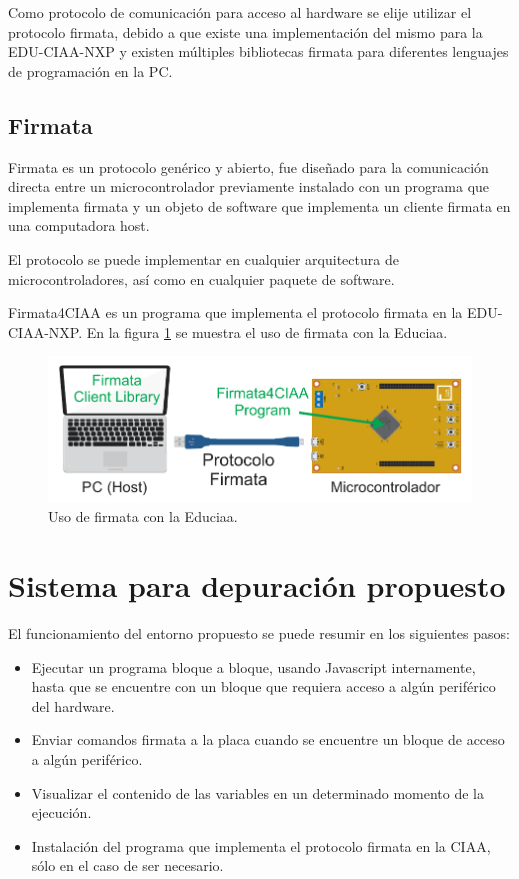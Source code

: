 Como protocolo de comunicación para acceso al hardware se elije utilizar el protocolo firmata, debido a que existe una implementación del mismo para la EDU-CIAA-NXP \citep{CIAA:firmwarev2} y existen múltiples bibliotecas firmata para diferentes lenguajes de programación en la PC.  

\subsection{Firmata}
\label{subsec:Firmata}

Firmata es un protocolo genérico y abierto, fue diseñado para la comunicación directa entre un microcontrolador previamente instalado con un programa que implementa firmata y un objeto de software que implementa un cliente firmata en una computadora host. 

El protocolo se puede implementar en cualquier arquitectura de microcontroladores, así como en cualquier paquete de software.

Firmata4CIAA es un programa que implementa el protocolo firmata en la EDU-CIAA-NXP. En la figura \ref{fig:componentesFirmata} se muestra el uso de firmata con la Educiaa.

\begin{figure}[h]
	\centering
	\includegraphics[scale=.80]{./Figures/Firmata4CIAA_01.pdf}
	\caption{Uso de firmata con la Educiaa.}
	\label{fig:componentesFirmata}
\end{figure}

\section{Sistema para depuración propuesto}
\label{section:Sistema para depuración propuesto}

El funcionamiento del entorno propuesto se puede resumir en los siguientes pasos:

\begin{itemize}
	\item Ejecutar un programa bloque a bloque, usando Javascript internamente, hasta que se encuentre con un bloque que requiera acceso a algún periférico del hardware.
	\item Enviar comandos firmata a la placa cuando se encuentre un bloque de acceso a algún periférico.
	\item Visualizar el contenido de las variables en un determinado momento de la ejecución.
	\item Instalación del programa que implementa el protocolo firmata en la CIAA, sólo en el caso de ser necesario.
\end{itemize}	

